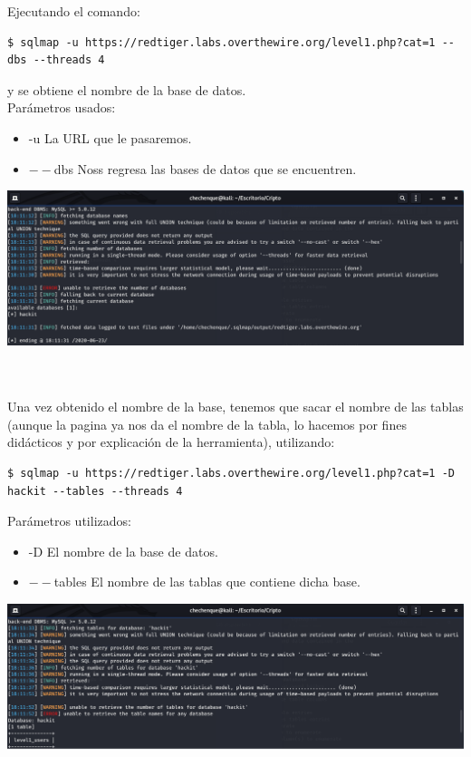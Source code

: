\documentclass[11pt,letterpaper]{article}
\begin{document}
Ejecutando el comando:\\
\begin{lstlisting}[style=consola]
$ sqlmap -u https://redtiger.labs.overthewire.org/level1.php?cat=1 --dbs --threads 4
\end{lstlisting} 
y se obtiene el nombre de la base de datos.\\
Parámetros usados:\\
\begin{itemize}
\item -u La URL que le pasaremos.
\item $--$dbs Noss regresa las bases de datos que se encuentren.
\end{itemize}
\begin{center}
\includegraphics[scale=.5]{./Img/sqlmap2.png}
\end{center}~\\~\\
Una vez obtenido el nombre de la base, tenemos que sacar el nombre de las tablas (aunque la pagina ya nos da el nombre de la tabla, lo hacemos por fines didácticos y por explicación de la herramienta), utilizando:\\ 
\begin{lstlisting}[style=consola]
$ sqlmap -u https://redtiger.labs.overthewire.org/level1.php?cat=1 -D hackit --tables --threads 4
\end{lstlisting} 
Parámetros utilizados:\\
\begin{itemize}
\item -D El nombre de la base de datos.
\item $--$tables El nombre de las tablas que contiene dicha base.
\end{itemize}
\begin{center}
\includegraphics[scale=.5]{./Img/sqlmap3.png}
\end{center}~\\~\\
\end{document}
